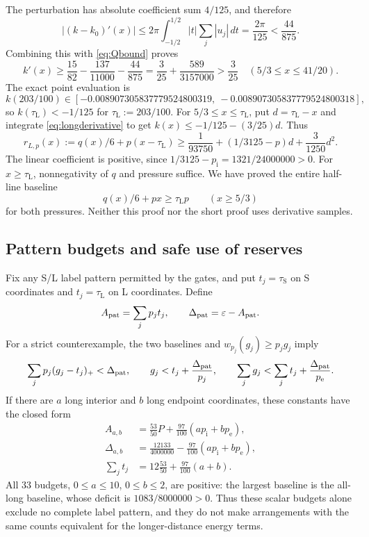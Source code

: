\documentclass[11pt]{amsart}
\numberwithin{equation}{section}
\newcommand{\eps}{\varepsilon}
\newcommand{\pe}{p_{\mathrm e}}
\newcommand{\pint}{p_{\mathrm i}}
\newcommand{\tS}{\tau_{\mathrm S}}
\newcommand{\tL}{\tau_{\mathrm L}}
\begin{document}
The perturbation has absolute coefficient sum $4/125$, and therefore
\[
 |(k-k_0)'(x)|\leq2\pi\int_{-1/2}^{1/2}|t|
       \sum_j|u_j|\,dt=\frac{2\pi}{125}<\frac{44}{875}.
\]
Combining this with \eqref{eq:Qbound} proves
\begin{equation}\label{eq:longderivative}
 k'(x)\geq\frac{15}{82}-\frac{137}{11000}-\frac{44}{875}
       =\frac3{25}+\frac{589}{3157000}>\frac3{25}
 \quad(5/3\leq x\leq41/20).
\end{equation}
The exact point evaluation is
\begin{equation}\label{eq:longpoint}
 k(203/100)\in
 [-0.008907305837779524800319,\ -0.008907305837779524800318],
\end{equation}
so $k(\tL)<-1/125$ for $\tL:=203/100$.
For $5/3\leq x\leq\tL$, put $d=\tL-x$ and integrate
\eqref{eq:longderivative} to get
$k(x)\leq-1/125-(3/25)d$. Thus
\begin{equation}\label{eq:longreserve}
 r_{L,p}(x):=q(x)/6+p(x-\tL)
 \geq\frac1{93750}+(1/3125-p)d+\frac3{1250}d^2.
\end{equation}
The linear coefficient is positive, since
$1/3125-\pint=1321/24000000>0$. For $x\geq\tL$,
nonnegativity of $q$ and pressure suffice. We have proved the entire
half-line baseline
\begin{equation}\label{eq:longbaseline}
 q(x)/6+px\geq\tL p\qquad(x\geq5/3)
\end{equation}
for both pressures. Neither this proof nor the short proof uses
derivative samples.

\subsection{Pattern budgets and safe use of reserves}

Fix any S/L label pattern permitted by the gates, and put $t_j=\tS$
on S coordinates and $t_j=\tL$ on L coordinates. Define
\begin{equation}\label{eq:patternAD}
 A_{\rm pat}=\sum_jp_jt_j,\qquad
 \Delta_{\rm pat}=\eps-A_{\rm pat}.
\end{equation}
For a strict counterexample, the two baselines and $w_{p_j}(g_j)\geq
p_jg_j$ imply
\begin{equation}\label{eq:patterncaps}
 \sum_jp_j(g_j-t_j)_+<\Delta_{\rm pat},\qquad
 g_j<t_j+\frac{\Delta_{\rm pat}}{p_j},\qquad
 \sum_jg_j<\sum_jt_j+\frac{\Delta_{\rm pat}}{\pe}.
\end{equation}
If there are $a$ long interior and $b$ long endpoint coordinates,
these constants have the closed form
\begin{align}
 A_{a,b}&=\frac{53}{50}P+\frac{97}{100}(a\pint+b\pe),
       \nonumber\\
 \Delta_{a,b}&=\frac{12133}{4000000}
                   -\frac{97}{100}(a\pint+b\pe),\label{eq:countbudgets}\\
 \sum_jt_j&=12\frac{53}{50}+\frac{97}{100}(a+b).\nonumber
\end{align}
All 33 budgets, $0\leq a\leq10$, $0\leq b\leq2$, are positive:
the largest baseline is the all-long baseline, whose deficit is
$1083/8000000>0$. Thus these scalar budgets alone exclude no complete
label pattern, and they do not make arrangements with the same
counts equivalent for the longer-distance energy terms.
\end{document}
